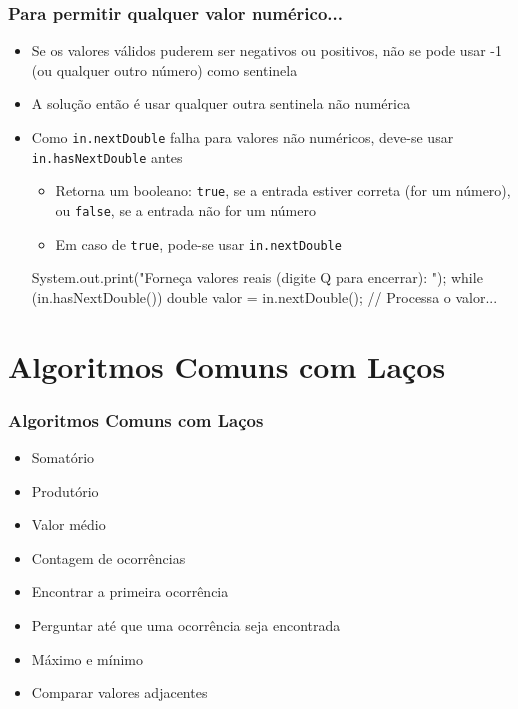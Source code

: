\documentclass[xcolor={dvipsnames,table},aspectratio=169]{beamer}
\begin{document}
\begin{frame}[fragile]\frametitle{Para permitir qualquer valor numérico...}
\begin{itemize}
	\item Se os valores válidos puderem ser negativos ou positivos, não se pode usar -1 (ou qualquer outro número) como sentinela
	\item A solução então é usar qualquer outra sentinela não numérica
	\item Como \texttt{in.nextDouble} falha para valores não numéricos, deve-se usar \texttt{in.hasNextDouble} antes
	\begin{itemize}
		\item Retorna um booleano: \texttt{true}, se a entrada estiver correta (for um número), ou \texttt{false}, se a entrada não for um número
		\item Em caso de \texttt{true}, pode-se usar \texttt{in.nextDouble}
	\end{itemize}
\begin{javacode}
System.out.print("Forneça valores reais (digite Q para encerrar): ");
while (in.hasNextDouble()) {
   double valor = in.nextDouble();
   // Processa o valor...
}
\end{javacode}
\end{itemize}
\end{frame}

\section{Algoritmos Comuns com Laços}

\begin{frame}\frametitle{Algoritmos Comuns com Laços}
\begin{itemize}
	\item Somatório
	\item Produtório
	\item Valor médio
	\item Contagem de ocorrências
	\item Encontrar a primeira ocorrência
	\item Perguntar até que uma ocorrência seja encontrada
	\item Máximo e mínimo
	\item Comparar valores adjacentes
\end{itemize}
\end{frame}
\end{document}
